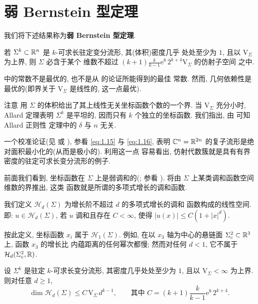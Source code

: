 \section{弱 Bernstein 型定理}
\label{sec:3.3}

我们将下述结果称为\textbf{弱 Bernstein 型定理}.

\begin{theorem}
\label{thm:3.16}
若 $\Sigma^k\subset\mathbb{R}^n$ 是 $k$-可求长驻定变分流形, 其(体积)密度几乎
处处至少为 $1$, 且以 $\mathrm{V}_\Sigma$ 为上界, 则 $\Sigma$ 必含于某个
维数不超过
$(k+1)\frac{k}{k-1}\mathrm{e}^8\,2^{k+4}\mathrm{V}_\Sigma$ 的仿射子空间
之中.
\end{theorem}

 中的常数不是最优的, 也不是从 \cite{CM16} 的论证所能得到的最佳
常数. 然而, 几何依赖性是最优的(即界关于 $\mathrm{V}_\Sigma$ 是线性的,
这一点最优).

注意 用 $\Sigma$ 的体积给出了其上线性无关坐标函数个数的一个界.
当 $\mathrm{V}_\Sigma$ 充分小时, Allard 定理表明 $\Sigma^k$ 是平坦的,
因而只有 $k$ 个独立的坐标函数. 我们指出, 由 可知 Allard 正则性
定理中的 $\delta$ 与 $n$ 无关.

一个校准论证(见 \cite{Fe} 或 \cite{Mr}), 参看 \eqref{eq:1.15} 与 \eqref{eq:1.16}, 表明
$\mathbb{C}^n=\mathbb{R}^{2n}$ 的复子流形是绝对面积最小化的(从而是极小的). 利用这一点
容易看出, 仿射代数簇就是具有有界密度的驻定可求长变分流形的例子.

前面我们看到, 坐标函数在 $\Sigma$ 上是弱调和的(; 参看
).  将由 $\Sigma$ 上某类调和函数空间维数的界推出, 这类
函数就是所谓的多项式增长的调和函数.

\begin{definition}[多项式增长的调和函数]
\label{def:3.17}
我们定义 $\mathcal{H}_d(\Sigma)$ 为增长阶不超过 $d$ 的多项式增长的调和
函数构成的线性空间. 即: $u\in\mathcal{H}_d(\Sigma)$, 若 $u$ 调和且存在
$C<\infty$, 使得 $|u(x)|\leq C(1+|x|^d)$.
\end{definition}

按此定义, 坐标函数 $x_i$ 属于 $\mathcal{H}_1(\Sigma)$. 例如, 在以
$x_3$ 轴为中心的悬链面 $\Sigma_c^2\subset\mathbb{R}^3$ 上, 函数 $x_3$ 的增长比
内蕴距离的任何幂次都慢; 然而对任何 $d<1$, 它不属于
$\mathcal{H}_d(\Sigma_c^2,\mathbb{R})$.

\begin{theorem}
\label{thm:3.18}
设 $\Sigma^k$ 是驻定 $k$-可求长变分流形, 其密度几乎处处至少为 $1$, 且以
$\mathrm{V}_\Sigma<\infty$ 为上界. 则对任意 $d\geq1$,
\begin{equation}
\dim\mathcal{H}_d(\Sigma)\leq C\,\mathrm{V}_\Sigma\,d^{k-1},
\qquad\text{其中 } C=(k+1)\frac{k}{k-1}\mathrm{e}^8\,2^{k+4}.
\label{eq:3.60}
\end{equation}
\end{theorem}

